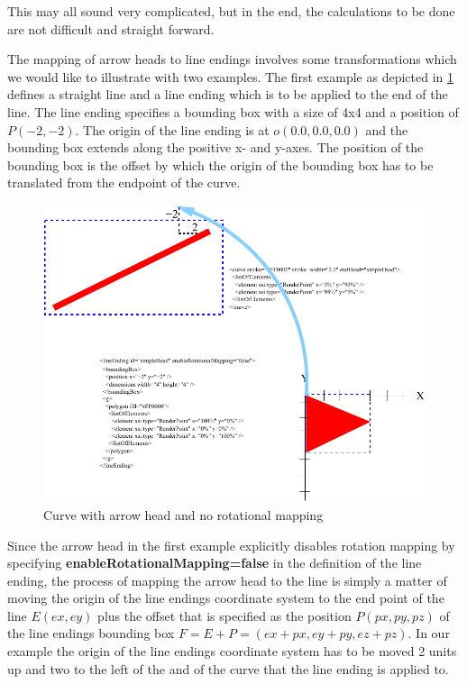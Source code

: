 This may all sound very complicated, but in the end, the calculations to be done are not difficult and straight forward. 

The mapping of arrow heads to line endings involves some transformations which we would like to illustrate with two examples.
The first example as depicted in \ref{fig:2ArrowHeadMapping} defines a straight line and a line ending which is to be applied
to the end of the line. The line ending specifies a bounding box with a size of 4x4 and a position of $P(-2,-2)$. 
The origin of the line ending is at $o(0.0,0.0,0.0)$ and the bounding box extends along the positive x- and y-axes.
The position of the bounding box is the offset by which the origin of the bounding box has to be translated from the endpoint of the curve.

\begin{figure}[!ht]
\begin{center}
\includegraphics{figures/ArrowHeadMapping2.pdf}
\end{center}
\caption{Curve with arrow head and no rotational mapping} \label{fig:2ArrowHeadMapping}
\end{figure}

Since the arrow head in the first example explicitly disables rotation mapping by specifying \textbf{enableRotationalMapping=false}
in the definition of the line ending, the process of mapping the arrow head to the line is simply a matter of moving the origin of 
the line endings coordinate system to the end point of the line $E(ex,ey)$ plus the offset that is specified as the position $P(px,py,pz)$ of the line endings bounding box $F=E+P=(ex+px,ey+py,ez+pz)$. In our example the origin of the line endings coordinate system has to be moved 2 units up and two to the left of the and of the curve that the line ending is applied to.

